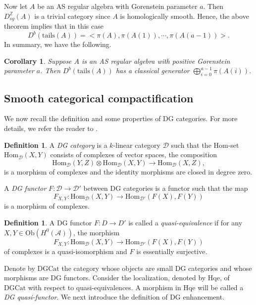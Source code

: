 \documentclass[11pt,reqno]{amsart}
\newtheorem{corollary}[theorem]{Corollary}
\theoremstyle{definition}
\newtheorem{definition}[theorem]{Definition}
\begin{document}
Now let $A$ be an AS regular algebra with Gorenstein parameter $a$. 
Then $D^{\mathbb{Z}}_{sg}(A)$ is a trivial category since $A$ is homologically smooth. 
Hence, the above theorem implies that in this case
$$
D^{b}(\mathrm{tails}(A)) = \big< \pi(A), \pi (A(1)), \cdots, 
\pi (A(a-1))\big>.
$$
In summary, we have the
following.



\begin{corollary}\label{ydbvwjv}
Suppose $A$ is an AS regular algebra with positive Gorenstein parameter $a$. Then
$D^{b}(\mathrm{tails}(A))$ has a classical generator 
$
\bigoplus\limits^{a-1}_{i = 0}\pi(A(i)).
$
\end{corollary}


\subsection{Smooth categorical compactification}

We now recall the definition and some properties of DG categories. 
For more details, we refer the reader to \cite{KB0}.

\begin{definition}
A {\it DG category} is a $k$-linear category $\mathcal{D}$ 
such that the Hom-set $\mathrm{Hom}_{\mathcal{D}}(X, Y)$ 
consists of complexes of vector spaces, the  composition  
$$
\mathrm{Hom}_{\mathcal{D}}(Y, Z) \otimes 
\mathrm{Hom}_{\mathcal{D}}(X, Y) \rightarrow \mathrm{Hom}_{\mathcal{D}}(X, Z),
$$ 
is a morphism of complexes and the identity morphisms are 
closed in degree zero.

A {\it DG functor} $F: \mathcal{D} \rightarrow \mathcal{D}'$ between DG categories is a 
functor such that the map 
$$
F_{X, Y}: \mathrm{Hom}_{\mathcal{D}}(X, Y) \rightarrow \mathrm{Hom}_{\mathcal{D}'}(F(X), F(Y))
$$
is a morphism of complexes. 
\end{definition}

\begin{definition}
A DG functor $F:D\to D'$ is called a {\it quasi-equivalence} if 
for any $X, Y \in \mathrm{Ob}(H^{0}(\mathcal{A}) )$, the morphism 
$$
F_{X, Y}: \mathrm{Hom}_{\mathcal{D}}(X, Y) \rightarrow \mathrm{Hom}_{\mathcal{D}'}(F(X), F(Y))
$$
of complexes is a quasi-isomorphism and $F$ is essentially  surjective. 
\end{definition}

Denote by $\mathrm{DGCat}$ the category whose objects are small 
DG categories and whose morphisms are DG functors. 
Consider the localization, denoted by $\mathrm{Hqe}$, of  $\mathrm{DGCat}$ 
with respect to quasi-equivalences. 
A morphism in $\mathrm{Hqe}$ will be called a {\it DG quasi-functor}. 
We next introduce the definition of
DG enhancement. 
\end{document}
